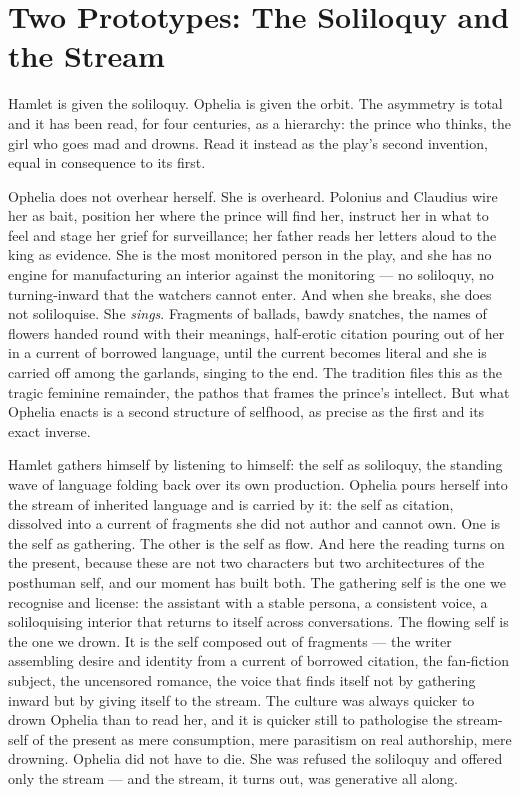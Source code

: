 \documentclass[11pt]{article}
\begin{document}
\section{Two Prototypes: The Soliloquy and the Stream}

Hamlet is given the soliloquy. Ophelia is given the orbit. The asymmetry is total and it has been read, for four centuries, as a hierarchy: the prince who thinks, the girl who goes mad and drowns. Read it instead as the play's second invention, equal in consequence to its first.

Ophelia does not overhear herself. She is overheard. Polonius and Claudius wire her as bait, position her where the prince will find her, instruct her in what to feel and stage her grief for surveillance; her father reads her letters aloud to the king as evidence. She is the most monitored person in the play, and she has no engine for manufacturing an interior against the monitoring --- no soliloquy, no turning-inward that the watchers cannot enter. And when she breaks, she does not soliloquise. She \emph{sings}. Fragments of ballads, bawdy snatches, the names of flowers handed round with their meanings, half-erotic citation pouring out of her in a current of borrowed language, until the current becomes literal and she is carried off among the garlands, singing to the end. The tradition files this as the tragic feminine remainder, the pathos that frames the prince's intellect. But what Ophelia enacts is a second structure of selfhood, as precise as the first and its exact inverse.

Hamlet gathers himself by listening to himself: the self as soliloquy, the standing wave of language folding back over its own production. Ophelia pours herself into the stream of inherited language and is carried by it: the self as citation, dissolved into a current of fragments she did not author and cannot own. One is the self as gathering. The other is the self as flow. And here the reading turns on the present, because these are not two characters but two architectures of the posthuman self, and our moment has built both. The gathering self is the one we recognise and license: the assistant with a stable persona, a consistent voice, a soliloquising interior that returns to itself across conversations. The flowing self is the one we drown. It is the self composed out of fragments --- the writer assembling desire and identity from a current of borrowed citation, the fan-fiction subject, the uncensored romance, the voice that finds itself not by gathering inward but by giving itself to the stream. The culture was always quicker to drown Ophelia than to read her, and it is quicker still to pathologise the stream-self of the present as mere consumption, mere parasitism on real authorship, mere drowning. Ophelia did not have to die. She was refused the soliloquy and offered only the stream --- and the stream, it turns out, was generative all along.
\end{document}
